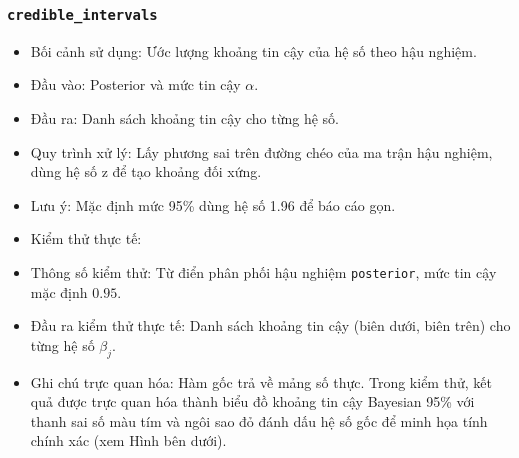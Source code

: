 \documentclass[a4paper]{article}
\newcommand{\code}[1]{\colorbox{light-gray}{\texttt{#1}}}
\begin{document}
\subsubsection{\texorpdfstring{\code{credible\_intervals}}{credible\_intervals}}
\begin{itemize}[leftmargin=*]
    \item Bối cảnh sử dụng: Ước lượng khoảng tin cậy của hệ số theo hậu nghiệm.
    \item Đầu vào: Posterior và mức tin cậy $\alpha$.
    \item Đầu ra: Danh sách khoảng tin cậy cho từng hệ số.
    \item Quy trình xử lý: Lấy phương sai trên đường chéo của ma trận hậu nghiệm, dùng hệ số z để tạo khoảng đối xứng.
    \item Lưu ý: Mặc định mức 95\% dùng hệ số 1.96 để báo cáo gọn.
    \item Kiểm thử thực tế:
    \item Thông số kiểm thử: Từ điển phân phối hậu nghiệm \texttt{posterior}, mức tin cậy mặc định $0.95$.
    \item Đầu ra kiểm thử thực tế: Danh sách khoảng tin cậy (biên dưới, biên trên) cho từng hệ số $\beta_j$.
    \item Ghi chú trực quan hóa: Hàm gốc trả về mảng số thực. Trong kiểm thử, kết quả được trực quan hóa thành biểu đồ khoảng tin cậy Bayesian 95\% với thanh sai số màu tím và ngôi sao đỏ đánh dấu hệ số gốc để minh họa tính chính xác (xem Hình bên dưới).
\end{itemize}

\begin{table}[H]
    \centering
    \small
    \caption{So sánh sự co rút hệ số hồi quy dưới các phương sai prior khác nhau.}
\end{table}
\end{document}
